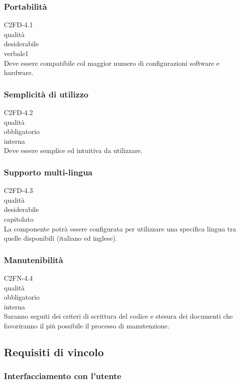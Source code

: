 \subsubsection*{Portabilit\`a}
 C2FD-4.1\\
 qualit\`a \\
 desiderabile \\
 verbale1 \\
Deve essere compatibile col maggior numero di configurazioni software e
hardware.

\subsubsection*{Semplicit\`a di utilizzo}
 C2FD-4.2\\
 qualit\`a \\
 obbligatorio \\
 interna \\
Deve essere semplice ed intuitiva da utilizzare.

\subsubsection*{Supporto multi-lingua}
 C2FD-4.3\\
 qualit\`a \\
 desiderabile \\
 capitolato \\
La componente potr\`a essere configurata per utilizzare una specifica lingua tra
quelle disponibili (italiano ed inglese).

\subsubsection*{Manutenibilit\`a}
 C2FN-4.4\\
 qualit\`a \\
 obbligatorio \\
 interna \\
Saranno seguiti dei criteri di scrittura del codice e stesura dei documenti che
favoriranno il pi\`u possibile il processo di manutenzione.

\subsection{Requisiti di vincolo}
\subsubsection{Interfacciamento con l'utente}

